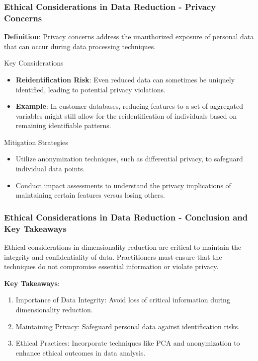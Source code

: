 \documentclass[aspectratio=169]{beamer}
\begin{document}
\begin{frame}[fragile]
    \frametitle{Ethical Considerations in Data Reduction - Privacy Concerns}
    \textbf{Definition}: Privacy concerns address the unauthorized exposure of personal data that can occur during data processing techniques.

    \begin{block}{Key Considerations}
        \begin{itemize}
            \item \textbf{Reidentification Risk}: Even reduced data can sometimes be uniquely identified, leading to potential privacy violations.
            \item \textbf{Example}: In customer databases, reducing features to a set of aggregated variables might still allow for the reidentification of individuals based on remaining identifiable patterns.
        \end{itemize}
    \end{block}

    \begin{block}{Mitigation Strategies}
        \begin{itemize}
            \item Utilize anonymization techniques, such as differential privacy, to safeguard individual data points.
            \item Conduct impact assessments to understand the privacy implications of maintaining certain features versus losing others.
        \end{itemize}
    \end{block}
\end{frame}

\begin{frame}[fragile]
    \frametitle{Ethical Considerations in Data Reduction - Conclusion and Key Takeaways}
    Ethical considerations in dimensionality reduction are critical to maintain the integrity and confidentiality of data. Practitioners must ensure that the techniques do not compromise essential information or violate privacy. 

    \textbf{Key Takeaways}:
    \begin{enumerate}
        \item Importance of Data Integrity: Avoid loss of critical information during dimensionality reduction.
        \item Maintaining Privacy: Safeguard personal data against identification risks.
        \item Ethical Practices: Incorporate techniques like PCA and anonymization to enhance ethical outcomes in data analysis.
    \end{enumerate}
\end{frame}
\end{document}

